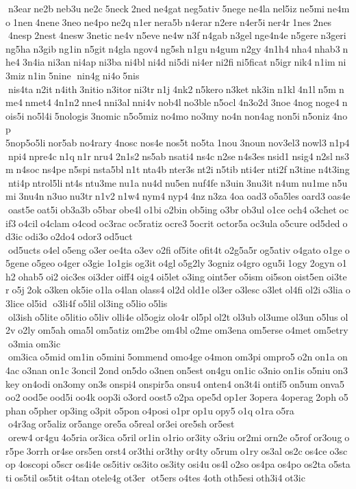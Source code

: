  n3ear ne2b neb3u ne2c 5neck 2ned ne4gat neg5ativ 5nege ne4la nel5iz ne5mi ne4mo 1nen 4nene 3neo ne4po ne2q n1er nera5b n4erar n2ere n4er5i ner4r 1nes 2nes  4nesp 2nest 4nesw 3netic ne4v n5eve ne4w n3f n4gab n3gel nge4n4e n5gere n3geri ng5ha n3gib ng1in n5git n4gla ngov4 ng5sh n1gu n4gum n2gy 4n1h4 nha4 nhab3 nhe4 3n4ia ni3an ni4ap ni3ba ni4bl ni4d ni5di ni4er ni2fi ni5ficat n5igr nik4 n1im ni3miz n1in 5nine  nin4g ni4o 5nis  nis4ta n2it n4ith 3nitio n3itor ni3tr n1j 4nk2 n5kero n3ket nk3in n1kl 4n1l n5m nme4 nmet4 4n1n2 nne4 nni3al nni4v nob4l no3ble n5ocl 4n3o2d 3noe 4nog noge4 nois5i no5l4i 5nologis 3nomic n5o5miz no4mo no3my no4n non4ag non5i n5oniz 4nop 	5nop5o5li nor5ab no4rary 4nosc nos4e nos5t no5ta 1nou 3noun nov3el3 nowl3 n1p4 npi4 npre4c n1q n1r nru4 2n1s2 ns5ab nsati4 ns4c n2se n4s3es nsid1 nsig4 n2sl ns3m n4soc ns4pe n5spi nsta5bl n1t nta4b nter3s nt2i n5tib nti4er nti2f n3tine n4t3ing nti4p ntrol5li nt4s ntu3me nu1a nu4d nu5en nuf4fe n3uin 3nu3it n4um nu1me n5umi 3nu4n n3uo nu3tr n1v2 n1w4 nym4 nyp4 4nz n3za 4oa oad3 o5a5les oard3 oas4e oast5e oat5i ob3a3b o5bar obe4l o1bi o2bin ob5ing o3br ob3ul o1ce och4 o3chet ocif3 o4cil o4clam o4cod oc3rac oc5ratiz ocre3 5ocrit octor5a oc3ula o5cure od5ded od3ic odi3o o2do4 odor3 od5uct  od5ucts o4el o5eng o3er oe4ta o3ev o2fi of5ite ofit4t o2g5a5r og5ativ o4gato o1ge o5gene o5geo o4ger o3gie 1o1gis og3it o4gl o5g2ly 3ogniz o4gro ogu5i 1ogy 2ogyn o1h2 ohab5 oi2 oic3es oi3der oiff4 oig4 oi5let o3ing oint5er o5ism oi5son oist5en oi3ter o5j 2ok o3ken ok5ie o1la o4lan olass4 ol2d old1e ol3er o3lesc o3let ol4fi ol2i o3lia o3lice ol5id  o3li4f o5lil ol3ing o5lio o5lis  ol3ish o5lite o5litio o5liv olli4e ol5ogiz olo4r ol5pl ol2t ol3ub ol3ume ol3un o5lus ol2v o2ly om5ah oma5l om5atiz om2be om4bl o2me om3ena om5erse o4met om5etry o3mia om3ic  om3ica o5mid om1in o5mini 5ommend omo4ge o4mon om3pi ompro5 o2n on1a on4ac o3nan on1c 3oncil 2ond on5do o3nen on5est on4gu on1ic o3nio on1is o5niu on3key on4odi on3omy on3s onspi4 onspir5a onsu4 onten4 on3t4i ontif5 on5um onva5 oo2 ood5e ood5i oo4k oop3i o3ord oost5 o2pa ope5d op1er 3opera 4operag 2oph o5phan o5pher op3ing o3pit o5pon o4posi o1pr op1u opy5 o1q o1ra o5ra  o4r3ag or5aliz or5ange ore5a o5real or3ei ore5sh or5est  orew4 or4gu 4o5ria or3ica o5ril or1in o1rio or3ity o3riu or2mi orn2e o5rof or3oug or5pe 3orrh or4se ors5en orst4 or3thi or3thy or4ty o5rum o1ry os3al os2c os4ce o3scop 4oscopi o5scr os4i4e os5itiv os3ito os3ity osi4u os4l o2so os4pa os4po os2ta o5stati os5til os5tit o4tan otele4g ot3er  ot5ers o4tes 4oth oth5esi oth3i4 ot3ic 